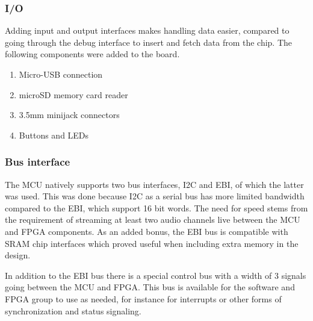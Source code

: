 \subsubsection{I/O}

Adding input and output interfaces makes handling data easier, compared to going
through the debug interface to insert and fetch data from the chip. The
following components were added to the board.

\begin{enumerate}
	\item Micro-USB connection
	\item microSD memory card reader
	\item 3.5mm minijack connectors
	\item Buttons and LEDs
\end{enumerate}

\subsubsection{Bus interface}

The MCU natively supports two bus interfaces, I2C and EBI, of which
the latter was used. This was done because I2C as a serial bus has more limited
bandwidth compared to the EBI, which support 16 bit words. The need for speed
stems from the requirement of streaming at least two audio channels live between
the MCU and FPGA components. As an added bonus, the EBI bus is compatible with
SRAM chip interfaces which proved useful when including extra memory in the
design.

In addition to the EBI bus there is a special control bus with a width of 3
signals going between the MCU and FPGA. This bus is available for the software
and FPGA group to use as needed, for instance for interrupts or other forms of
synchronization and status signaling.
